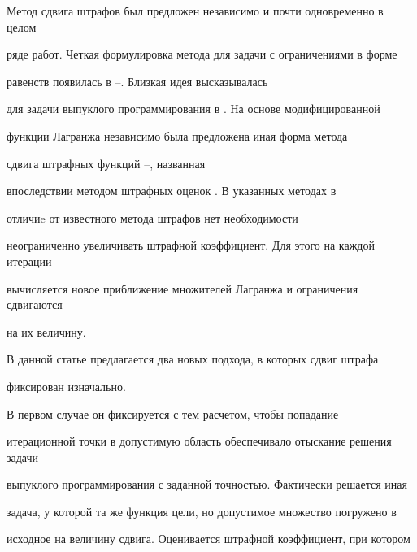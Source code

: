 \pagestyle{plain} %







\maketitle


\label{begin}





Метод сдвига штрафов был предложен независимо и почти одновременно в целом 


ряде работ. Четкая формулировка метода для задачи с ограничениями в форме 


равенств появилась в \cite{Pow}--\cite{Haar}. Близкая идея высказывалась 


для задачи выпуклого программирования в \cite{Gor}. На основе модифицированной 


функции Лагранжа \cite{Err} независимо была предложена иная форма метода 


сдвига штрафных функций \cite{Hest}--\cite{Wier}, названная 


впоследствии методом штрафных оценок \cite{PolTr}. В указанных методах в


отличиe от известного метода штрафов \cite{Fiacco} нет необходимости 


неограниченно увеличивать штрафной коэффициент. Для этого на каждой итерации 


вычисляется новое приближение множителей Лагранжа и ограничения сдвигаются


на их величину.





В данной статье предлагается два новых подхода, в которых сдвиг штрафа


фиксирован изначально.


В первом случае он фиксируется с тем расчетом, чтобы попадание 


итерационной точки в допустимую область обеспечивало отыскание решения задачи


выпуклого программирования с заданной точностью. Фактически решается иная 


задача, у которой та же функция цели, но допустимое множество погружено в


исходное на величину сдвига. Оценивается штрафной коэффициент, при котором 


